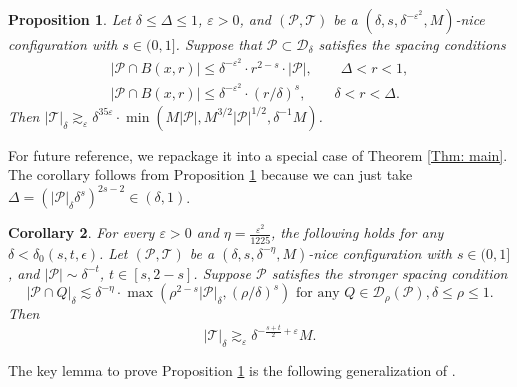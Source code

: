 \documentclass{amsart}
\newtheorem{prop}{Proposition}[section]
\newtheorem{cor}[prop]{Corollary}
\newcommand{\eps}{\varepsilon}
\newcommand{\lesim}{\lesssim}
\newcommand{\cD}{\mathcal{D}}
\newcommand{\cT}{\mathcal{T}}
\newcommand{\cP}{\mathcal{P}}
\begin{document}
\begin{prop}\label{prop: key}
    Let $\delta \le \Delta \le 1$, $\eps > 0$, and $(\cP, \cT)$ be a $(\delta, s, \delta^{-\eps^2}, M)$-nice configuration with $s\in (0, 1]$. Suppose that
    $\cP \subset \cD_\delta$ satisfies the spacing conditions
    \begin{gather}
        |\cP \cap B(x, r)| \le \delta^{-\eps^2} \cdot r^{2-s} \cdot |\cP|, \qquad \Delta < r < 1, \\
        |\cP \cap B(x, r)| \le \delta^{-\eps^2} \cdot (r/\delta)^s, \qquad \delta < r < \Delta. \label{eqn:spacing condition 2}
    \end{gather}
    Then $|\cT|_{\delta} \gtrsim_\eps \delta^{35\eps} \cdot \min(M|\cP|, M^{3/2} |\cP|^{1/2}, \delta^{-1} M)$.
\end{prop}

For future reference, we repackage it into a special case of Theorem \ref{Thm: main}. The corollary follows from Proposition \ref{prop: key} because we can just take $\Delta = (|\cP|_\delta 
 \delta^s)^{2s-2} \in (\delta, 1)$.
\begin{cor}\label{cor: key}
    For every $\eps > 0$ and $\eta = \frac{\eps^2}{1225}$, the following holds for any $ \delta < \delta_0(s, t, \epsilon)$. Let $(\cP, \cT)$ be a $(\delta, s, \delta^{-\eta}, M)$-nice configuration with $s\in (0, 1]$, and $|\cP| \sim \delta^{-t}$, $t \in [s, 2-s]$.
    Suppose $\cP$ satisfies the stronger spacing condition
    \begin{equation*}
        |\cP \cap Q|_\delta \lesim \delta^{-\eta} \cdot \max(\rho^{2-s} |\cP|_\delta, (\rho/\delta)^s) \text{ for any } Q \in \cD_\rho (\cP), \delta \le \rho \le 1.
    \end{equation*}
   Then
    \[
    |\cT|_{\delta} \gtrsim_\eps \delta^{-\frac{s+t}{2}+\eps} M.
    \]
\end{cor}

The key lemma to prove Proposition \ref{prop: key} is the following generalization of \cite[Theorem 1.1]{guth2019incidence}.
\end{document}

